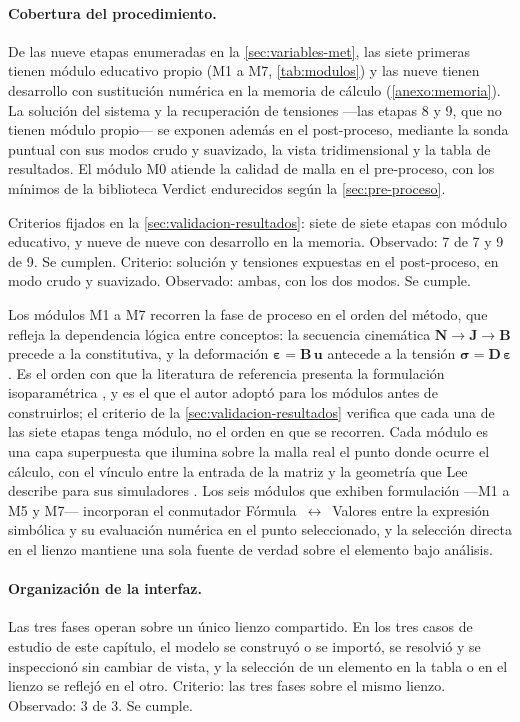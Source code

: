 \paragraph{Cobertura del procedimiento.} De las nueve etapas enumeradas en la \autoref{sec:variables-met}, las siete primeras tienen módulo educativo propio (M1 a M7, \autoref{tab:modulos}) y las nueve tienen desarrollo con sustitución numérica en la memoria de cálculo (\autoref{anexo:memoria}). La solución del sistema y la recuperación de tensiones —las etapas 8 y 9, que no tienen módulo propio— se exponen además en el post-proceso, mediante la sonda puntual con sus modos crudo y suavizado, la vista tridimensional y la tabla de resultados. El módulo M0 atiende la calidad de malla en el pre-proceso, con los mínimos de la biblioteca Verdict \autocite[pp.~51, 57]{stimpson2007verdict} endurecidos según la \autoref{sec:pre-proceso}.

Criterios fijados en la \autoref{sec:validacion-resultados}: siete de siete etapas con módulo educativo, y nueve de nueve con desarrollo en la memoria. Observado: 7 de 7 y 9 de 9. Se cumplen. Criterio: solución y tensiones expuestas en el post-proceso, en modo crudo y suavizado. Observado: ambas, con los dos modos. Se cumple.

Los módulos M1 a M7 recorren la fase de proceso en el orden del método, que refleja la dependencia lógica entre conceptos: la secuencia cinemática $\bm{N}\rightarrow\bm{J}\rightarrow\bm{B}$ precede a la constitutiva, y la deformación $\bm{\varepsilon} = \bm{B}\,\bm{u}$ antecede a la tensión $\bm{\sigma} = \bm{D}\,\bm{\varepsilon}$. Es el orden con que la literatura de referencia presenta la formulación isoparamétrica \autocite{bathe2014fem,cook2002concepts}, y es el que el autor adoptó para los módulos antes de construirlos; el criterio de la \autoref{sec:validacion-resultados} verifica que cada una de las siete etapas tenga módulo, no el orden en que se recorren. Cada módulo es una capa superpuesta que ilumina sobre la malla real el punto donde ocurre el cálculo, con el vínculo entre la entrada de la matriz y la geometría que Lee describe para sus simuladores \autocite[pp.~163, 166]{lee2015interactive}. Los seis módulos que exhiben formulación —M1 a M5 y M7— incorporan el conmutador Fórmula~$\leftrightarrow$~Valores entre la expresión simbólica y su evaluación numérica en el punto seleccionado, y la selección directa en el lienzo mantiene una sola fuente de verdad sobre el elemento bajo análisis.

\paragraph{Organización de la interfaz.} Las tres fases operan sobre un único lienzo compartido. En los tres casos de estudio de este capítulo, el modelo se construyó o se importó, se resolvió y se inspeccionó sin cambiar de vista, y la selección de un elemento en la tabla o en el lienzo se reflejó en el otro. Criterio: las tres fases sobre el mismo lienzo. Observado: 3 de 3. Se cumple.

